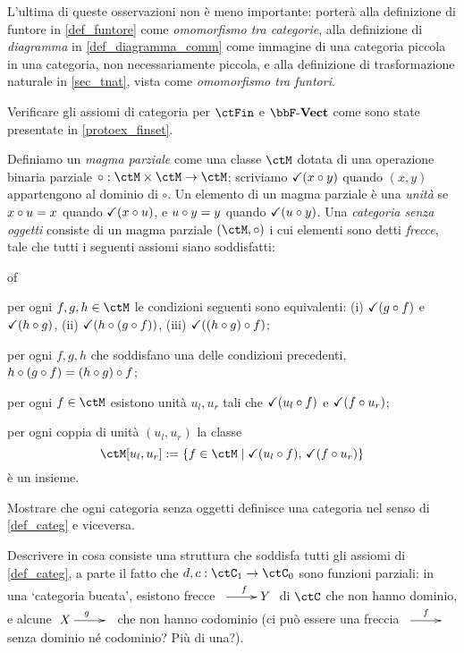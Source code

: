 L'ultima di queste osservazioni non è meno importante: porterà alla definizione di funtore in \ref{def_funtore} come \emph{omomorfismo tra categorie}, alla definizione di \emph{diagramma} in \ref{def_diagramma_comm} come immagine di una categoria piccola in una categoria, non necessariamente piccola, e alla definizione di trasformazione naturale in \ref{sec_tnat}, vista come \emph{omomorfismo tra funtori}.
\begin{esercizi}
	\item \label{jgdasoh_4} Verificare gli assiomi di categoria per \(\ctFin\) e \(\ctVect\) come sono state presentate in \ref{protoex_finset}.
	\item \label{jgdasoh_1} Definiamo un \emph{magma parziale} come una classe \(\ctM\) dotata di una operazione binaria parziale \(\circ : \ctM\times\ctM\to\ctM\); scriviamo \(\checkmark(x\circ y)\) quando \((x,y)\) appartengono al dominio di \(\circ\). Un elemento di un magma parziale è una \emph{unità} se \(x\circ u = x\) quando \(\checkmark(x\circ u)\), e \(u\circ y = y\) quando \(\checkmark(u\circ y)\). Una \emph{categoria senza oggetti} consiste di un magma parziale \((\ctM,\cmp)\) i cui elementi sono detti \emph{frecce}, tale che tutti i seguenti assiomi siano soddisfatti:
	\begin{enumtag}{of}
		\item per ogni \(f,g,h\in\ctM\) le condizioni seguenti sono equivalenti: (i) \(\checkmark(g\circ f)\) e \(\checkmark(h\circ g)\), (ii) \(\checkmark(h\circ (g\circ f))\), (iii) \(\checkmark((h\circ g)\circ f)\);
		\item per ogni \(f,g,h\) che soddisfano una delle condizioni precedenti, \(h\circ (g\circ f) = (h\circ g)\circ f\);
		\item per ogni \(f\in\ctM\) esistono unità \(u_l,u_r\) tali che \(\checkmark(u_l\circ f)\) e \(\checkmark(f\circ u_r)\);
		\item per ogni coppia di unità \((u_l,u_r)\) la classe
		\[\ctM[u_l,u_r] := \{f\in\ctM\mid \checkmark(u_l\cmp f),\,\checkmark(f\cmp u_r)\}\]
		è un insieme.
	\end{enumtag}
	Mostrare che ogni categoria senza oggetti definisce una categoria nel senso di \ref{def_categ} e viceversa.
	\item \label{jgdasoh_2} Descrivere in cosa consiste una struttura che soddisfa tutti gli assiomi di \ref{def_categ}, a parte il fatto che \(d,c : \ctC_1\to\ctC_0\) sono funzioni parziali: in una `categoria bucata', esistono frecce \(\xymatrix{{} \ar[r]^f & Y}\) di \(\ctC\) che non hanno dominio, e alcune \(\xymatrix{X \ar[r]^g & {}}\) che non hanno codominio (ci può essere una freccia \(\xymatrix{{} \ar[r]^f & {}}\) senza dominio né codominio? Più di una?).

\end{esercizi}
